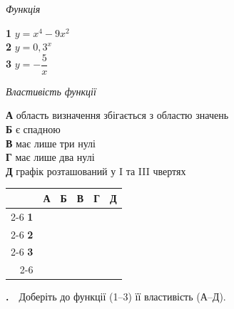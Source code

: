 \documentclass[12pt]{article}
\newcommand{\matchingGrid}{%
    \begingroup
    \renewcommand{\arraystretch}{1.15}
    \setlength{\tabcolsep}{4pt}
    \footnotesize
    \begin{tabular}{r|c|c|c|c|c|}
         \multicolumn{1}{c}{} & \multicolumn{1}{c}{\textbf{А}} & \multicolumn{1}{c}{\textbf{Б}} & \multicolumn{1}{c}{\textbf{В}} & \multicolumn{1}{c}{\textbf{Г}} & \multicolumn{1}{c}{\textbf{Д}} \\ \cline{2-6}
         \textbf{1} & \phantom{X} & \phantom{X} & \phantom{X} & \phantom{X} & \phantom{X} \\ \cline{2-6}
         \textbf{2} & & & & & \\ \cline{2-6}
         \textbf{3} & & & & & \\ \cline{2-6}
    \end{tabular}
    \endgroup
}
\newcounter{zad}
\newcommand{\zadnum}{\stepcounter{zad}\textbf{\thezad.}\ \ }
\begin{document}
\vspace{0.3cm}
\noindent
\begin{minipage}[t]{0.34\textwidth}
\textit{Функція}\par\vspace{0.2cm}
\textbf{1} \quad $y = x^4 - 9x^2$\\[0.35cm]
\textbf{2} \quad $y = 0{,}3^x$\\[0.35cm]
\textbf{3} \quad $y = -\dfrac{5}{x}$
\end{minipage}
\hfill
\begin{minipage}[t]{0.52\textwidth}
\textit{Властивість функції}\par\vspace{0.2cm}
\textbf{А} \quad область визначення збігається з областю значень\\[0.12cm]
\textbf{Б} \quad є спадною\\[0.12cm]
\textbf{В} \quad має лише три нулі\\[0.12cm]
\textbf{Г} \quad має лише два нулі\\[0.12cm]
\textbf{Д} \quad графік розташований у I та III чвертях
\end{minipage}
\hfill
\begin{minipage}[t]{0.12\textwidth}
\vspace{0.5cm}
\begin{flushright}\matchingGrid\end{flushright}
\end{minipage}
\par\vspace{0.5cm}
\zadnum Доберіть до функції (1--3) її властивість (А--Д).
\end{document}
